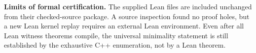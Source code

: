 \documentclass[11pt,a4paper]{article}
\begin{document}
\noindent\textbf{Limits of formal certification.} The supplied Lean
files are included unchanged from their checked-source package. A
source inspection found no proof holes, but a new Lean kernel replay
requires an external Lean environment. Even after all Lean witness
theorems compile, the universal minimality statement is still
established by the exhaustive C++ enumeration, not by a Lean theorem.
\end{document}
